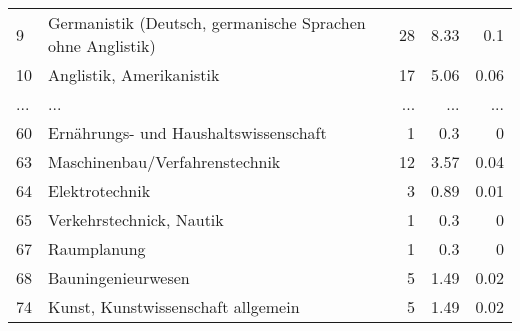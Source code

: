 \begin{longtable}{lXrrr}
        9 & \multicolumn{1}{X}{Germanistik (Deutsch, germanische Sprachen ohne Anglistik)} & %
          \num{28} &
          \num[round-mode=places,round-precision=2]{8,33} &
          \num[round-mode=places,round-precision=2]{0,1} \\
        10 & \multicolumn{1}{X}{Anglistik, Amerikanistik} & %
          \num{17} &
          \num[round-mode=places,round-precision=2]{5,06} &
          \num[round-mode=places,round-precision=2]{0,06} \\
       ... & ... & ... & ... & ... \\
        60 & \multicolumn{1}{X}{Ernährungs- und Haushaltswissenschaft} & %
          \num{1} &
          \num[round-mode=places,round-precision=2]{0,3} &
          \num[round-mode=places,round-precision=2]{0} \\

        63 & \multicolumn{1}{X}{Maschinenbau/Verfahrenstechnik} & %
          \num{12} &
          \num[round-mode=places,round-precision=2]{3,57} &
          \num[round-mode=places,round-precision=2]{0,04} \\

        64 & \multicolumn{1}{X}{Elektrotechnik} & %
          \num{3} &
          \num[round-mode=places,round-precision=2]{0,89} &
          \num[round-mode=places,round-precision=2]{0,01} \\

        65 & \multicolumn{1}{X}{Verkehrstechnick, Nautik} & %
          \num{1} &
          \num[round-mode=places,round-precision=2]{0,3} &
          \num[round-mode=places,round-precision=2]{0} \\

        67 & \multicolumn{1}{X}{Raumplanung} & %
          \num{1} &
          \num[round-mode=places,round-precision=2]{0,3} &
          \num[round-mode=places,round-precision=2]{0} \\

        68 & \multicolumn{1}{X}{Bauningenieurwesen} & %
          \num{5} &
          \num[round-mode=places,round-precision=2]{1,49} &
          \num[round-mode=places,round-precision=2]{0,02} \\

        74 & \multicolumn{1}{X}{Kunst, Kunstwissenschaft allgemein} & %
          \num{5} &
          \num[round-mode=places,round-precision=2]{1,49} &
          \num[round-mode=places,round-precision=2]{0,02} \\


\end{longtable}

